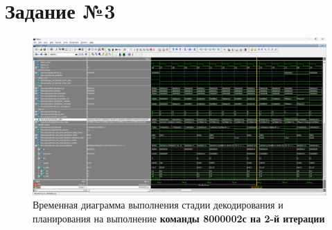 \chapter{Задание №3}

\begin{figure}
    \centering
    \includegraphics[width=1\linewidth]{images/task_03.png}
    \caption{Временная диаграмма выполнения стадии декодирования и планирования на выполнение \textbf{команды 8000002с на 2-й итерации}}
    \label{fig:task_03}
\end{figure}